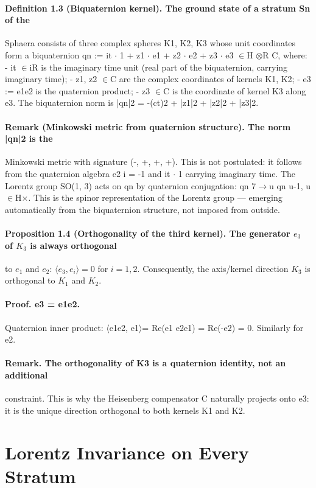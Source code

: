 \paragraph*{Definition 1.3 (Biquaternion kernel). The ground state of a stratum Sn of the}
Sphaera consists of three complex spheres K1, K2, K3 whose unit coordinates form a biquaternion qn := it $\cdot$ 1 + z1 $\cdot$ e1 + z2 $\cdot$ e2 + z3 $\cdot$ e3 $\in$H $\otimes$R C, where:
- it $\in$iR is the imaginary time unit (real part of the biquaternion, carrying
imaginary time);
- z1, z2 $\in$C are the complex coordinates of kernels K1, K2;
- e3 := e1e2 is the quaternion product;
- z3 $\in$C is the coordinate of kernel K3 along e3.
The biquaternion norm is |qn|2 = -(ct)2 + |z1|2 + |z2|2 + |z3|2.
\paragraph*{Remark (Minkowski metric from quaternion structure). The norm |qn|2 is the}
Minkowski metric with signature (-, +, +, +). This is not postulated: it follows from the quaternion algebra e2 i = -1 and it $\cdot$ 1 carrying imaginary time. The Lorentz group SO(1, 3) acts on qn by quaternion conjugation: qn 7$\to$u qn u-1, u $\in$H$\times$. This is the spinor representation of the Lorentz group --- emerging automatically from the biquaternion structure, not imposed from outside.
\paragraph*{Proposition 1.4 (Orthogonality of the third kernel). The generator $e_3$ of $K_3$ is always orthogonal}
to $e_1$ and $e_2$: $\langle e_3, e_i\rangle = 0$ for $i=1,2$. Consequently, the axis/kernel direction $K_3$ is orthogonal to $K_1$ and $K_2$.
\paragraph*{Proof. e3 = e1e2.}
Quaternion inner product: $\langle$e1e2, e1$\rangle$= Re(e1 e2e1) = Re(-e2) = 0. Similarly for e2.
\paragraph*{Remark. The orthogonality of K3 is a quaternion identity, not an additional}
constraint. This is why the Heisenberg compensator C naturally projects onto e3: it is the unique direction orthogonal to both kernels K1 and K2.

\section{Lorentz Invariance on Every Stratum}
